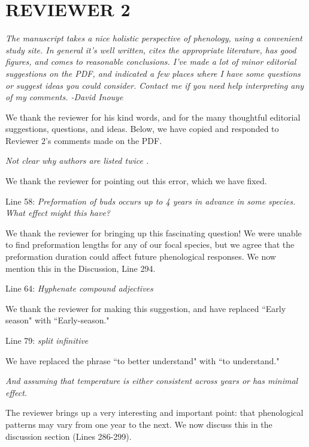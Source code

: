 \documentclass[10.95pt,a4paper]{letter}
\begin{document}
\section {REVIEWER 2}

\par \emph{The manuscript takes a nice holistic perspective of phenology, using a convenient study site. In general it's well written, cites the appropriate literature, has good figures, and comes to reasonable conclusions. I've made a lot of minor editorial suggestions on the PDF, and indicated a few places where I have some questions or suggest ideas you could consider. Contact me if you need help interpreting any of my comments. 
-David Inouye}
\par We thank the reviewer for his kind words, and for the many thoughtful editorial suggestions, questions, and ideas. Below, we have copied and responded to Reviewer 2's comments made on the PDF.

\par \emph{Not clear why authors are listed twice .}
\par We thank the reviewer for pointing out this error, which we have fixed. 

\par Line 58: \emph{Preformation of buds occurs up to 4 years in advance in some species.  What effect might this have?}
\par We thank the reviewer for bringing up this fascinating question! We were unable to find preformation lengths for any of our focal species, but we agree that the preformation duration could affect future phenological responses. We now mention this in the Discussion, Line 294.

\par Line 64: \emph{Hyphenate compound adjectives}
\par We thank the reviewer for making this suggestion, and have replaced ``Early season" with ``Early-season."
 
\par Line 79: \emph{split infinitive}
\par We have replaced the phrase ``to better understand" with ``to understand."
 
\par \emph{And assuming that temperature is either consistent across years or has minimal effect.}
\par The reviewer brings up a very interesting and important point: that phenological patterns may vary from one year to the next. We now discuss this in the discussion section (Lines 286-299). 
\end{document}
